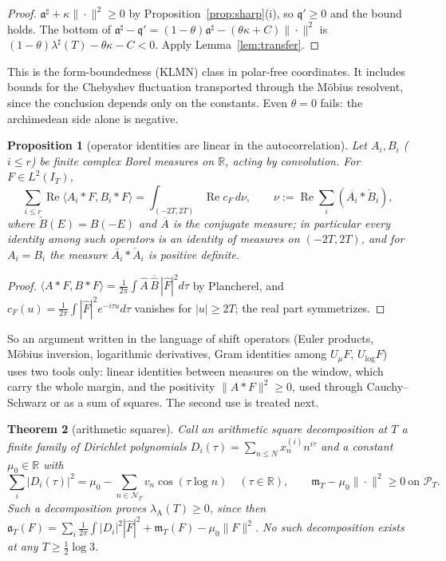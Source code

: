 \documentclass[11pt]{amsart}
\newtheorem{theorem}{Theorem}[section]
\newtheorem{proposition}[theorem]{Proposition}
\theoremstyle{definition}
\theoremstyle{remark}
\newcommand{\R}{\mathbb R}
\newcommand{\Rel}{\operatorname{Re}}
\newcommand{\PT}{\mathcal P_T}
\newcommand{\IT}{I_T}
\newcommand{\lamA}{\lambda_{\mathrm A}(T)}
\newcommand{\Fh}{\widehat F}
\newcommand{\cF}{c_F}
\newcommand{\NT}{\mathcal N_T}
\newcommand{\mT}{\mathfrak m_T}
\begin{document}
\begin{proof}
$\mathfrak a^\sharp+\kappa\|\cdot\|^2\ge0$ by Proposition~\ref{prop:sharp}(i), so $\mathfrak q'\ge0$ and the bound holds. The bottom of
$\mathfrak a^\sharp-\mathfrak q'=(1-\theta)\mathfrak a^\sharp-(\theta\kappa+C)\|\cdot\|^2$ is $(1-\theta)\lambda^\sharp(T)-\theta\kappa-C<0$. Apply
Lemma~\ref{lem:transfer}.
\end{proof}

This is the form-boundedness (KLMN) class in polar-free coordinates. It includes bounds for the Chebyshev fluctuation transported
through the M\"obius resolvent, since the conclusion depends only on the constants. Even $\theta=0$ fails: the archimedean
side alone is negative.

\begin{proposition}[operator identities are linear in the autocorrelation]\label{prop:opcalc}
Let $A_i,B_i$ ($i\le r$) be finite complex Borel measures on $\R$, acting by convolution. For $F\in L^2(\IT)$,
\[
\sum_{i\le r}\Rel\langle A_i*F,B_i*F\rangle=\int_{(-2T,2T)}\Rel\cF\,d\nu,\qquad \nu:=\Rel\sum_i(\overline{A_i}*\check B_i),
\]
where $\check B(E)=B(-E)$ and $\overline{A}$ is the conjugate measure; in particular every identity among such operators is an identity
of measures on $(-2T,2T)$, and for $A_i=B_i$ the measure $\overline{A_i}*\check A_i$ is positive definite.
\end{proposition}

\begin{proof}
$\langle A*F,B*F\rangle=\frac1{2\pi}\int\widehat A\,\overline{\widehat B}\,|\Fh|^2d\tau$ by Plancherel, and $\cF(u)=\frac1{2\pi}\int|\Fh|^2e^{-i\tau u}d\tau$
vanishes for $|u|\ge2T$; the real part symmetrizes.
\end{proof}

So an argument written in the language of shift operators (Euler products, M\"obius inversion, logarithmic derivatives,
Gram identities among $U_\mu F$, $U_{\log}F$) uses two tools only: linear identities between measures on the window, which carry
the whole margin, and the positivity $\|A*F\|^2\ge0$, used through Cauchy--Schwarz or as a sum of squares. The second use is
treated next.

\begin{theorem}[arithmetic squares]\label{thm:sos}
Call an \emph{arithmetic square decomposition at $T$} a finite family of Dirichlet polynomials $D_i(\tau)=\sum_{n\le N}x^{(i)}_nn^{i\tau}$
and a constant $\mu_0\in\R$ with
\[
\sum_i|D_i(\tau)|^2=\mu_0-\sum_{n\in\NT}v_n\cos(\tau\log n)\quad(\tau\in\R),\qquad \mT-\mu_0\|\cdot\|^2\ge0\ \text{on }\PT .
\]
Such a decomposition proves $\lamA\ge0$, since then $\mathfrak a_T(F)=\sum_i\frac1{2\pi}\int|D_i|^2|\Fh|^2+\mT(F)-\mu_0\|F\|^2$. No such
decomposition exists at any $T\ge\frac12\log3$.
\end{theorem}
\end{document}
